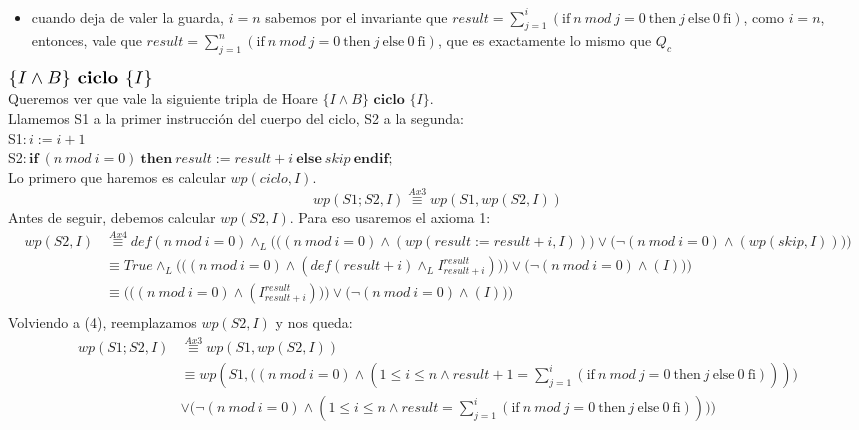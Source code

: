 \documentclass{article}
\begin{document}
\begin{enumerate}[label=\alph*)]
\begin{itemize}
	\item cuando deja de valer la guarda, $i=n$ sabemos por el invariante que $result=\sum_{j=1}^{i}(\textrm{if}\ n\ mod\ j=0\ \textrm{then}\ j\ \textrm{else}\ 0\ \textrm{fi})$, como $i=n$, entonces,
	vale que $result=\sum_{j=1}^{n}(\textrm{if}\ n\ mod\ j=0\ \textrm{then}\ j\ \textrm{else}\ 0\ \textrm{fi})$, que es exactamente lo mismo que $Q_c$
	\end{itemize}
	$\scalebox{1.3}{$\{I\wedge B\} \textbf{ ciclo } \{I\}$}$\medskip \\
	Queremos ver que vale la siguiente tripla de Hoare $\{I\wedge B\} \textbf{ ciclo } \{I\}$.\\
	Llamemos S1 a la primer instrucción del cuerpo del ciclo, S2 a la segunda:\\
	S1$: i:=i+1$\\
	S2$: \textbf{if}\ (n\ mod\ i=0)\ \textbf{then}\ result:=result+i\ \textbf{else}\ skip\ \textbf{endif};$\\
	Lo primero que haremos es calcular $wp(ciclo,I)$.
	\begin{equation}wp(S1;S2,I)\stackrel{Ax3}{\equiv}wp(S1,wp(S2,I))\end{equation}
	Antes de seguir, debemos calcular $wp(S2,I)$. Para eso usaremos el axioma 1:
	\begin{align*}
	wp(S2,I)&\stackrel{Ax4}{\equiv}def(n\ mod\ i=0)\wedge_L \Bigg(\Big((n\ mod\ i=0)\wedge (wp(result:=result+i,I))\Big) 
   				\vee \Big(\neg  (n\ mod\ i=0)\wedge (wp(skip,I))\Big)\Bigg)\\
		&\equiv True \wedge_L \Bigg(\Big((n\ mod\ i=0)\wedge (def(result+i)\wedge_LI_{result+i}^{result}))\Big) 
   				\vee \Big(\neg  (n\ mod\ i=0)\wedge (I)\Big)\Bigg)\\
		&\equiv \Bigg(\Big((n\ mod\ i=0)\wedge (I_{result+i}^{result}))\Big) 
   				\vee \Big(\neg  (n\ mod\ i=0)\wedge (I)\Big)\Bigg)\\
	\end{align*}
	Volviendo a (4), reemplazamos $wp(S2,I)$ y nos queda:
	\begin{align*}
	wp(S1;S2,I)&\stackrel{Ax3}{\equiv}wp(S1,wp(S2,I))\\
	&\equiv  wp(S1,\Big((n\ mod\ i=0)\wedge (1\leq i\leq n \wedge result+1=\sum_{j=1}^{i}(\textrm{if}\ n\ mod\ j=0\ \textrm{then}\ j\ \textrm{else}\ 0\ \textrm{fi})))\Big) 
   				\\ &\vee \Big(\neg  (n\ mod\ i=0)\wedge (1\leq i\leq n \wedge result=\sum_{j=1}^{i}(\textrm{if}\ n\ mod\ j=0\ \textrm{then}\ j\ \textrm{else}\ 0\ \textrm{fi}))\Big))\\

\end{align*}
\end{enumerate}
\end{document}
